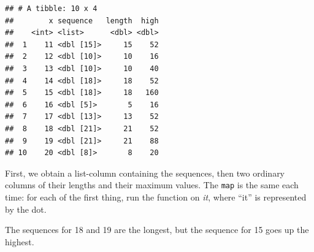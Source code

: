 \documentclass[]{tufte-book}
\theoremstyle{definition}
\theoremstyle{definition}
\theoremstyle{definition}
\theoremstyle{remark}
\begin{document}
\begin{verbatim}
## # A tibble: 10 x 4
##        x sequence   length  high
##    <int> <list>      <dbl> <dbl>
##  1    11 <dbl [15]>     15    52
##  2    12 <dbl [10]>     10    16
##  3    13 <dbl [10]>     10    40
##  4    14 <dbl [18]>     18    52
##  5    15 <dbl [18]>     18   160
##  6    16 <dbl [5]>       5    16
##  7    17 <dbl [13]>     13    52
##  8    18 <dbl [21]>     21    52
##  9    19 <dbl [21]>     21    88
## 10    20 <dbl [8]>       8    20
\end{verbatim}

First, we obtain a list-column containing the sequences, then two
ordinary columns of their lengths and their maximum values. The
\texttt{map} is the same each time: for each of the first thing, run the
function on \emph{it}, where ``it'' is represented by the dot.

The sequences for 18 and 19 are the longest, but the sequence for 15
goes up the highest.
\end{document}
